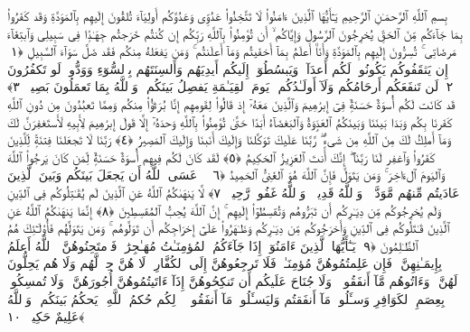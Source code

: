 
  
    
  
    
    

\nopagebreak
  بِسمِ ٱللَّهِ ٱلرَّحمَـٰنِ ٱلرَّحِيمِ
  يَـٰٓأَيُّهَا ٱلَّذِينَ ءَامَنُوا۟ لَا تَتَّخِذُوا۟ عَدُوِّى وَعَدُوَّكُم أَولِيَآءَ تُلقُونَ إِلَيهِم بِٱلمَوَدَّةِ وَقَد كَفَرُوا۟ بِمَا جَآءَكُم مِّنَ ٱلحَقِّ يُخرِجُونَ ٱلرَّسُولَ وَإِيَّاكُم ۙ أَن تُؤمِنُوا۟ بِٱللَّهِ رَبِّكُم إِن كُنتُم خَرَجتُم جِهَـٰدًۭا فِى سَبِيلِى وَٱبتِغَآءَ مَرضَاتِى ۚ تُسِرُّونَ إِلَيهِم بِٱلمَوَدَّةِ وَأَنَا۠ أَعلَمُ بِمَآ أَخفَيتُم وَمَآ أَعلَنتُم ۚ وَمَن يَفعَلهُ مِنكُم فَقَد ضَلَّ سَوَآءَ ٱلسَّبِيلِ ﴿١﴾
 إِن يَثقَفُوكُم يَكُونُوا۟ لَكُم أَعدَآءًۭ وَيَبسُطُوٓا۟ إِلَيكُم أَيدِيَهُم وَأَلسِنَتَهُم بِٱلسُّوٓءِ وَوَدُّوا۟ لَو تَكفُرُونَ ﴿٢﴾
 لَن تَنفَعَكُم أَرحَامُكُم وَلَآ أَولَـٰدُكُم ۚ يَومَ ٱلقِيَـٰمَةِ يَفصِلُ بَينَكُم ۚ وَٱللَّهُ بِمَا تَعمَلُونَ بَصِيرٌۭ ﴿٣﴾
 قَد كَانَت لَكُم أُسوَةٌ حَسَنَةٌۭ فِىٓ إِبرَٰهِيمَ وَٱلَّذِينَ مَعَهُۥٓ إِذ قَالُوا۟ لِقَومِهِم إِنَّا بُرَءَٰٓؤُا۟ مِنكُم وَمِمَّا تَعبُدُونَ مِن دُونِ ٱللَّهِ كَفَرنَا بِكُم وَبَدَا بَينَنَا وَبَينَكُمُ ٱلعَدَٟوَةُ وَٱلبَغضَآءُ أَبَدًا حَتَّىٰ تُؤمِنُوا۟ بِٱللَّهِ وَحدَهُۥٓ إِلَّا قَولَ إِبرَٰهِيمَ لِأَبِيهِ لَأَستَغفِرَنَّ لَكَ وَمَآ أَملِكُ لَكَ مِنَ ٱللَّهِ مِن شَىءٍۢ ۖ رَّبَّنَا عَلَيكَ تَوَكَّلنَا وَإِلَيكَ أَنَبنَا وَإِلَيكَ ٱلمَصِيرُ ﴿٤﴾
 رَبَّنَا لَا تَجعَلنَا فِتنَةًۭ لِّلَّذِينَ كَفَرُوا۟ وَٱغفِر لَنَا رَبَّنَآ ۖ إِنَّكَ أَنتَ ٱلعَزِيزُ ٱلحَكِيمُ ﴿٥﴾
 لَقَد كَانَ لَكُم فِيهِم أُسوَةٌ حَسَنَةٌۭ لِّمَن كَانَ يَرجُوا۟ ٱللَّهَ وَٱليَومَ ٱلءَاخِرَ ۚ وَمَن يَتَوَلَّ فَإِنَّ ٱللَّهَ هُوَ ٱلغَنِىُّ ٱلحَمِيدُ ﴿٦﴾
 ۞ عَسَى ٱللَّهُ أَن يَجعَلَ بَينَكُم وَبَينَ ٱلَّذِينَ عَادَيتُم مِّنهُم مَّوَدَّةًۭ ۚ وَٱللَّهُ قَدِيرٌۭ ۚ وَٱللَّهُ غَفُورٌۭ رَّحِيمٌۭ ﴿٧﴾
 لَّا يَنهَىٰكُمُ ٱللَّهُ عَنِ ٱلَّذِينَ لَم يُقَـٰتِلُوكُم فِى ٱلدِّينِ وَلَم يُخرِجُوكُم مِّن دِيَـٰرِكُم أَن تَبَرُّوهُم وَتُقسِطُوٓا۟ إِلَيهِم ۚ إِنَّ ٱللَّهَ يُحِبُّ ٱلمُقسِطِينَ ﴿٨﴾
 إِنَّمَا يَنهَىٰكُمُ ٱللَّهُ عَنِ ٱلَّذِينَ قَـٰتَلُوكُم فِى ٱلدِّينِ وَأَخرَجُوكُم مِّن دِيَـٰرِكُم وَظَـٰهَرُوا۟ عَلَىٰٓ إِخرَاجِكُم أَن تَوَلَّوهُم ۚ وَمَن يَتَوَلَّهُم فَأُو۟لَـٰٓئِكَ هُمُ ٱلظَّـٰلِمُونَ ﴿٩﴾
 يَـٰٓأَيُّهَا ٱلَّذِينَ ءَامَنُوٓا۟ إِذَا جَآءَكُمُ ٱلمُؤمِنَـٰتُ مُهَـٰجِرَٰتٍۢ فَٱمتَحِنُوهُنَّ ۖ ٱللَّهُ أَعلَمُ بِإِيمَـٰنِهِنَّ ۖ فَإِن عَلِمتُمُوهُنَّ مُؤمِنَـٰتٍۢ فَلَا تَرجِعُوهُنَّ إِلَى ٱلكُفَّارِ ۖ لَا هُنَّ حِلٌّۭ لَّهُم وَلَا هُم يَحِلُّونَ لَهُنَّ ۖ وَءَاتُوهُم مَّآ أَنفَقُوا۟ ۚ وَلَا جُنَاحَ عَلَيكُم أَن تَنكِحُوهُنَّ إِذَآ ءَاتَيتُمُوهُنَّ أُجُورَهُنَّ ۚ وَلَا تُمسِكُوا۟ بِعِصَمِ ٱلكَوَافِرِ وَسـَٔلُوا۟ مَآ أَنفَقتُم وَليَسـَٔلُوا۟ مَآ أَنفَقُوا۟ ۚ ذَٟلِكُم حُكمُ ٱللَّهِ ۖ يَحكُمُ بَينَكُم ۚ وَٱللَّهُ عَلِيمٌ حَكِيمٌۭ ﴿١٠﴾
